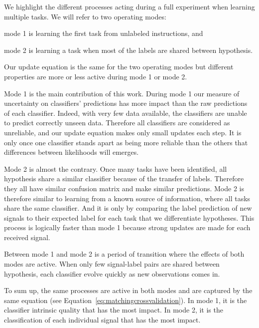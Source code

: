 We highlight the different processes acting during a full experiment when learning multiple tasks. We will refer to two operating modes: \begin{inparaenum}[a)] \item mode 1 is learning the first task from unlabeled instructions, and \item mode 2 is learning a task when most of the labels are shared between hypothesis. \end{inparaenum} Our update equation is the same for the two operating modes but different properties are more or less active during mode 1 or mode 2.

Mode 1 is the main contribution of this work. During mode 1 our measure of uncertainty on classifiers' predictions has more impact than the raw predictions of each classifier. Indeed, with very few data available, the classifiers are unable to predict correctly unseen data. Therefore all classifiers are considered as unreliable, and our update equation makes only small updates each step. It is only once one classifier stands apart as being more reliable than the others that differences between likelihoods will emerges. 

Mode 2 is almost the contrary. Once many tasks have been identified, all hypothesis share a similar classifier because of the transfer of labels. Therefore they all have similar confusion matrix and make similar predictions. Mode 2 is therefore similar to learning from a known source of information, where all tasks share the same classifier. And it is only by comparing the label prediction of new signals to their expected label for each task that we differentiate hypotheses. This process is logically faster than mode 1 because strong updates are made for each received signal.

Between mode 1 and mode 2 is a period of transition where the effects of both modes are active. When only few signal-label pairs are shared between hypothesis, each classifier evolve quickly as new observations comes in. 

To sum up, the same processes are active in both modes and are captured by the same equation (see Equation~\ref{eq:matchingcrossvalidation}). In mode 1, it is the classifier intrinsic quality that has the most impact. In mode 2, it is the classification of each individual signal that has the most impact. 

